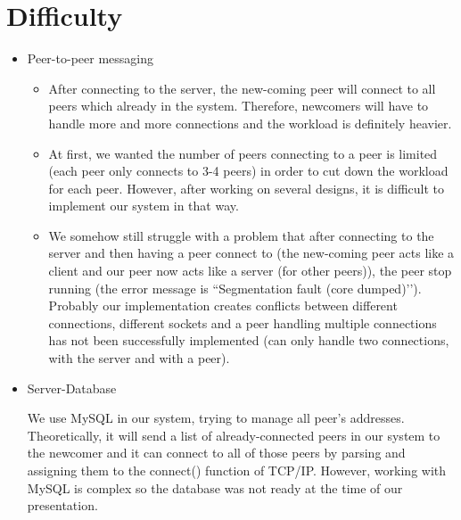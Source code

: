 \documentclass[12pt]{article}
\begin{document}
    \section{Difficulty}
    \begin{itemize}
    \item Peer-to-peer messaging
        \begin{itemize}
            \item After connecting to the server, the new-coming peer will connect to all peers which already in the system. Therefore, newcomers will have to handle more and more connections and the workload is definitely heavier.
            \item At first, we wanted the number of peers connecting to a peer is limited (each peer only connects to 3-4 peers) in order to cut down the workload for each peer. However, after working on several designs, it is difficult to implement our system in that way.
            \item We somehow still struggle with a problem that after connecting to the server and then having a peer connect to (the new-coming peer acts like a client and our peer now acts like a server (for other peers)), the peer stop running (the error message is “Segmentation fault (core dumped)’’). Probably our implementation creates conflicts between different connections, different sockets and a peer handling multiple connections has not been successfully implemented (can only handle two connections, with the server and with a peer).

        \end{itemize}
        \item Server-Database
        
        We use MySQL in our system, trying to manage all peer’s addresses. Theoretically, it will send a list of already-connected peers in our system to the newcomer and it can connect to all of those peers by parsing and assigning them to the connect() function of TCP/IP. However, working with MySQL is complex so the database was not ready at the time of our presentation.
    \end{itemize}
    
\end{document}
